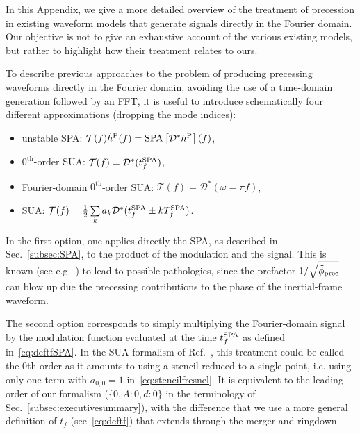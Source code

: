 \documentclass[aps,showpacs,twocolumn,
prd,superscriptaddress,nofootinbib]{revtex4-1}
\newcommand\calT{{\mathcal{T}}}
\newcommand\calD{{\mathcal{D}}}
\newcommand{\Tf}{T_{f}}
\newcommand{\tfSPA}{t_{f}^{\rm SPA}}
\begin{document}
In this Appendix, we give a more detailed overview of the treatment of precession in existing waveform models that generate signals directly in the Fourier domain. Our objective is not to give an exhaustive account of the various existing models, but rather to highlight how their treatment relates to ours.

To describe previous approaches to the problem of producing precessing waveforms directly in the Fourier domain, avoiding the use of a time-domain generation followed by an FFT, it is useful to introduce schematically four different approximations (dropping the mode indices):
\begin{itemize}
	\item unstable SPA: $\calT(f) \tilde{h}^{\rm P}(f) = \mathrm{SPA}\left[ \calD^{*} h^{\rm P} \right](f)$,
	\item $0^{\text{th}}$-order SUA: $\calT(f) = \calD^{*}(\tfSPA) $,
	\item Fourier-domain $0^{\text{th}}$-order SUA: $\calT(f) = \calD^{*}(\omega = \pi f ) $,
	\item SUA: $\calT(f) = \frac{1}{2} \sum\limits_{k} a_{k} \calD^{*}(\tfSPA \pm k \Tf^{\rm SPA})$.
\end{itemize}

In the first option, one applies directly the SPA, as described in Sec.~\ref{subsec:SPA}, to the product of the modulation and the signal. This is known (see e.g.~\cite{KCY13}) to lead to possible pathologies, since the prefactor $1/\sqrt{\ddot{\phi}_{\rm prec}}$ can blow up due the precessing contributions to the phase of the inertial-frame waveform.

The second option corresponds to simply multiplying the Fourier-domain signal by the modulation function evaluated at the time $\tfSPA$ as defined in~\eqref{eq:deftfSPA}. In the SUA formalism of Ref.~\cite{KCY14}, this treatment could be called the 0th order as it amounts to using a stencil reduced to a single point, i.e. using only one term with $a_{0,0} = 1$ in~\eqref{eq:stencilfresnel}. It is equivalent to the leading order of our formalism ($\{0, A:0, d:0 \}$ in the terminology of Sec.~\ref{subsec:executivesummary}), with the difference that we use a more general definition of $t_{f}$ (see~\eqref{eq:deftf}) that extends through the merger and ringdown.
\end{document}
